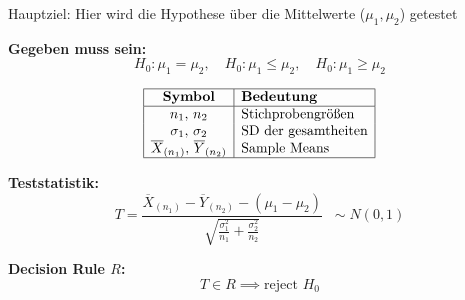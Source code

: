 \begin{center}

\columnbreak
{}

Hauptziel: Hier wird die Hypothese über die
Mittelwerte ($\mu_1, \mu_2$) getestet
\end{center}

\begin{center}
\end{center}

\large{\textbf{Gegeben muss sein:}}
\[
H_0: \mu_1 = \mu_2, \quad 
H_0: \mu_1 \leq \mu_2, \quad 
H_0: \mu_1 \geq \mu_2
\]

\[
\begin{array}{|c|l|}
\hline
\textbf{Symbol} & \textbf{Bedeutung} \\
\hline
n_1,\,n_2 & \text{Stichprobengrößen} \\
\sigma_1,\,\sigma_2 & \text{SD der gesamtheiten} \\
\overline{X}_{(n_1)},\,\overline{Y}_{(n_2)} & \text{Sample Means} \\
\hline
\end{array}
\]

\normalsize

\large{\textbf{Teststatistik:}}
\[
T = \frac{\overline{X}_{(n_1)} - \overline{Y}_{(n_2)} - (\mu_1 - \mu_2)}
{\sqrt{\frac{\sigma_1^2}{n_1} + \frac{\sigma_2^2}{n_2}}}
\;\;\sim N(0,1)
\]

\large{\textbf{Decision Rule \(R\):}}
\[
T \in R \implies \text{reject } H_0
\]

